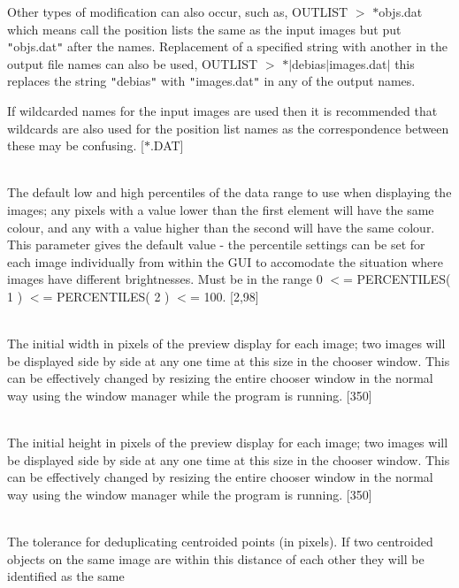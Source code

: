 \documentclass[twoside,11pt]{article}
\renewcommand{\_}{\texttt{\symbol{95}}}
\newcommand{\sstsubsection}[1]{ \item[{#1}] \mbox{} \\}
\newcommand{\sstsubsection}[1]{\item[{#1}]}
\begin{document}
{{{         Other types of modification can also occur, such as,
            OUTLIST $>$ $*$\_objs.dat
         which means call the position lists the same as the input images
         but put {\tt "}\_objs.dat{\tt "} after the names. Replacement of a specified
         string with another in the output file names can also be used,
            OUTLIST $>$ $*$$|$\_debias$|$\_images.dat$|$
         this replaces the string {\tt "}\_debias{\tt "} with {\tt "}\_images.dat{\tt "} in any
         of the output names.

         If wildcarded names for the input images are used then it is
         recommended that wildcards are also used for the position list
         names as the correspondence between these may be confusing.
         [$*$.DAT]
      }
      \sstsubsection{
         PERCENTILES( 2 ) = \_DOUBLE (Read)
      }{
         The default low and high percentiles of the data range to use
         when displaying the images; any pixels with a value lower than
         the first element will have the same colour, and any with a
         value higher than the second will have the same colour.  This
         parameter gives the default value - the percentile settings
         can be set for each image individually from within the GUI
         to accomodate the situation where images have different
         brightnesses.  Must be in the range 0 $<$= PERCENTILES( 1 )
         $<$= PERCENTILES( 2 ) $<$= 100.
         [2,98]
      }
      \sstsubsection{
         PREVX = \_INTEGER (Read and Write)
      }{
         The initial width in pixels of the preview display for each image;
         two images will be displayed side by side at any one time at
         this size in the chooser window.  This can be effectively changed
         by resizing the entire chooser window in the normal way using
         the window manager while the program is running.
         [350]
      }
      \sstsubsection{
         PREVY = \_INTEGER (Read and Write)
      }{
         The initial height in pixels of the preview display for each image;
         two images will be displayed side by side at any one time at
         this size in the chooser window.  This can be effectively changed
         by resizing the entire chooser window in the normal way using
         the window manager while the program is running.
         [350]
      }
      \sstsubsection{
         TOLER = \_DOUBLE (Read)
      }{
         The tolerance for deduplicating centroided points (in pixels).
         If two centroided objects on the same image are within this 
         distance of each other they will be identified as the same 
}}}
\end{document}
